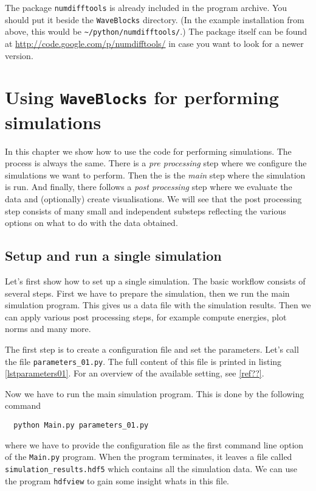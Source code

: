 \documentclass[a4paper,10pt]{report}
\begin{document}
The package \texttt{numdifftools} is already included in the program archive.
You should put it beside the \texttt{WaveBlocks} directory. (In the example installation
from above, this would be \verb|~/python/numdifftools/|.) The package itself
can be found at \url{http://code.google.com/p/numdifftools/}
in case you want to look for a newer version.



\chapter{Using \texttt{WaveBlocks} for performing simulations}

In this chapter we show how to use the code for performing simulations. The process
is always the same. There is a \emph{pre processing} step where we configure the
simulations we want to perform. Then the is the \emph{main} step where the simulation
is run. And finally, there follows a \emph{post processing} step where we evaluate
the data and (optionally) create visualisations. We will see that the post processing
step consists of many small and independent substeps reflecting the various options
on what to do with the data obtained.

\section{Setup and run a single simulation}

Let's first show how to set up a single simulation. The basic workflow consists of
several steps. First we have to prepare the simulation, then we run the main simulation
program. This gives us a data file with the simulation results. Then we can apply various
post processing steps, for example compute energies, plot norms and many more.

The first step is to create a configuration file and set the parameters. Let's
call the file \texttt{parameters\_01.py}. The full content of this file is printed
in listing \ref{lstparameters01}. For an overview of the available setting, see \ref{ref??}.

Now we have to run the main simulation program. This is done by the following command

\begin{verbatim}
  python Main.py parameters_01.py
\end{verbatim}

where we have to provide the configuration file as the first command line option
of the \texttt{Main.py} program. When the program terminates, it leaves a file
called \texttt{simulation\_results.hdf5} which contains all the simulation data.
We can use the program \texttt{hdfview} to gain some insight whats in this file.
\end{document}
